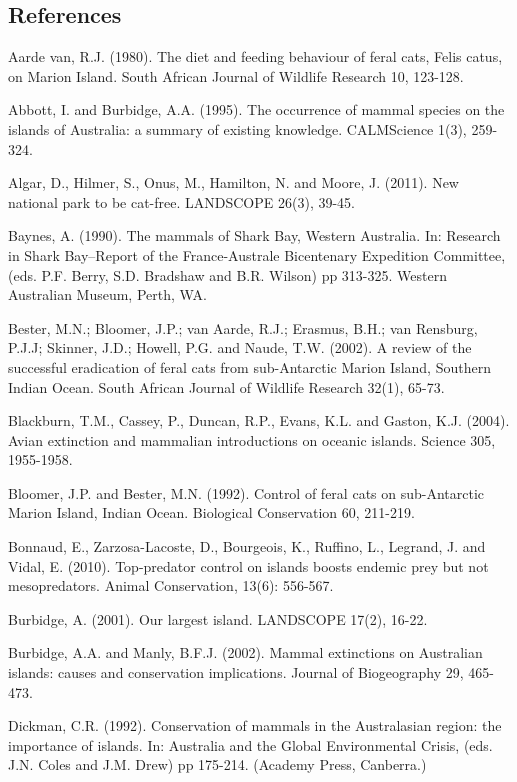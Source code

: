 \documentclass[version=last,
    paper=a4,                               %
    10pt,                                   %
    dvipsnames,
    oneside,                              %
    headings=openany,                       %
    open=any,
    BCOR=7mm,                               %
    DIV=15,     %
]{scrbook}
\begin{document}
\subsection*{References}

Aarde van, R.J. (1980). The diet and feeding behaviour of feral cats,
Felis catus, on Marion Island. South African Journal of Wildlife
Research 10, 123-128.

Abbott, I. and Burbidge, A.A. (1995). The occurrence of mammal species
on the islands of Australia: a summary of existing knowledge.
CALMScience 1(3), 259-324.

Algar, D., Hilmer, S., Onus, M., Hamilton, N. and Moore, J. (2011). New
national park to be cat-free. LANDSCOPE 26(3), 39-45.

Baynes, A. (1990). The mammals of Shark Bay, Western Australia. In:
Research in Shark Bay--Report of the France-Australe Bicentenary
Expedition Committee, (eds. P.F. Berry, S.D. Bradshaw and B.R. Wilson)
pp 313-325. Western Australian Museum, Perth, WA.

Bester, M.N.; Bloomer, J.P.; van Aarde, R.J.; Erasmus, B.H.; van
Rensburg, P.J.J; Skinner, J.D.; Howell, P.G. and Naude, T.W. (2002). A
review of the successful eradication of feral cats from sub-Antarctic
Marion Island, Southern Indian Ocean. South African Journal of Wildlife
Research 32(1), 65-73.

Blackburn, T.M., Cassey, P., Duncan, R.P., Evans, K.L. and Gaston, K.J.
(2004). Avian extinction and mammalian introductions on oceanic islands.
Science 305, 1955-1958.

Bloomer, J.P. and Bester, M.N. (1992). Control of feral cats on
sub-Antarctic Marion Island, Indian Ocean. Biological Conservation 60,
211-219.

Bonnaud, E., Zarzosa-Lacoste, D., Bourgeois, K., Ruffino, L., Legrand,
J. and Vidal, E. (2010). Top-predator control on islands boosts endemic
prey but not mesopredators. Animal Conservation, 13(6): 556-567.

Burbidge, A. (2001). Our largest island. LANDSCOPE 17(2), 16-22.

Burbidge, A.A. and Manly, B.F.J. (2002). Mammal extinctions on
Australian islands: causes and conservation implications. Journal of
Biogeography 29, 465-473.

Dickman, C.R. (1992). Conservation of mammals in the Australasian
region: the importance of islands. In: Australia and the Global
Environmental Crisis, (eds. J.N. Coles and J.M. Drew) pp 175-214.
(Academy Press, Canberra.)
\end{document}
